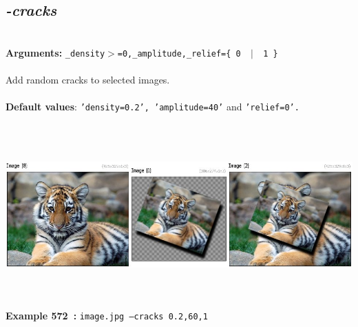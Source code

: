 \documentclass[a4paper,11pt,twoside]{book}
\begin{document}
\subsection{\emph{-cracks} }\vspace*{-0.5em}
~\\\textbf{Arguments: } 
{\small \texttt{\_density$>$=0,\_amplitude,\_relief=\{ 0 ~$|$~ 1 \}}}\\~\\
Add random cracks to selected images.
~\\~\\\textbf{Default values}: {\small \texttt{'density=0.2', 'amplitude=40'} and \texttt{'relief=0'.}}
\begin{center}\includegraphics[keepaspectratio=true,height=7cm,width=\textwidth]{img/gmic_def572.jpg}\\
{\footnotesize \textbf{Example 572~:} \texttt{image.jpg --cracks 0.2,60,1}}
\end{center}
\end{document}
